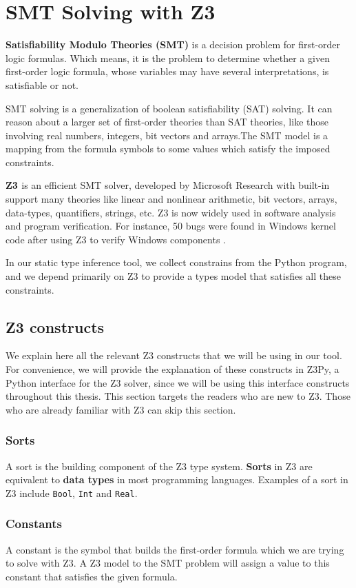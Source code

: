 \section{SMT Solving with Z3 \cite{z3}}
\textbf{Satisfiability Modulo Theories (SMT)} is a decision problem for first-order logic formulas. Which means, it is the problem to determine whether a given first-order logic formula, whose variables may have several interpretations, is satisfiable or not.

SMT solving is a generalization of boolean satisfiability (SAT) solving. It can reason about a larger set of first-order theories than SAT theories, like those involving real numbers, integers, bit vectors and arrays.The SMT model is a mapping from the formula symbols to some values which satisfy the imposed constraints.

\textbf{Z3 \cite{z3}} is an efficient SMT solver, developed by Microsoft Research with built-in support many theories like linear and nonlinear arithmetic, bit vectors, arrays, data-types, quantifiers, strings, etc. Z3 is now widely used in software analysis and program verification. For instance, 50 bugs were found in Windows kernel code after using Z3 to verify Windows components \cite{expz3}.

In our static type inference tool, we collect constrains from the Python program, and we depend primarily on Z3 to provide a types model that satisfies all these constraints.

\subsection{Z3 constructs}
We explain here all the relevant Z3 constructs that we will be using in our tool. For convenience, we will provide the explanation of these constructs in Z3Py, a Python interface for the Z3 solver, since we will be using this interface constructs throughout this thesis. This section targets the readers who are new to Z3. Those who are already familiar with Z3 can skip this section.

\subsubsection{Sorts}
A sort is the building component of the Z3 type system. \textbf{Sorts} in Z3 are equivalent to \textbf{data types} in most programming languages. Examples of a sort in Z3 include \lstinline|Bool|, \lstinline|Int| and \lstinline|Real|.

\subsubsection{Constants}
A constant is the symbol that builds the first-order formula which we are trying to solve with Z3. A Z3 model to the SMT problem will assign a value to this constant that satisfies the given formula.

